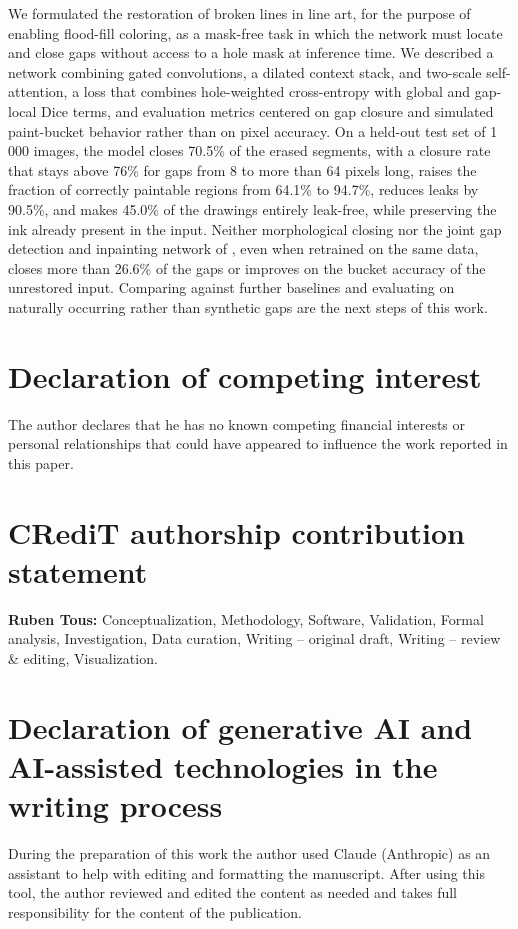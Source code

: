 \documentclass[preprint,12pt]{elsarticle}
\begin{document}
We formulated the restoration of broken lines in line art, for the purpose
of enabling flood-fill coloring, as a mask-free task in which the network must
locate and close gaps without access to a hole mask at inference time. We
described a network combining gated convolutions, a dilated context stack, and
two-scale self-attention, a loss that combines hole-weighted cross-entropy with
global and gap-local Dice terms, and evaluation metrics centered on gap closure and
simulated paint-bucket behavior rather than on pixel accuracy. On a held-out test set
of 1\,000 images, the model closes 70.5\% of the erased segments, with a closure rate
that stays above 76\% for gaps from 8 to more than 64 pixels long, raises the
fraction of correctly paintable regions from 64.1\% to 94.7\%, reduces leaks by
90.5\%, and makes 45.0\% of the drawings entirely leak-free, while preserving the ink
already present in the input. Neither morphological closing nor the joint gap
detection and inpainting network of \citet{sasaki2017joint}, even when retrained on
the same data, closes more than 26.6\% of the gaps or improves on the bucket accuracy
of the unrestored input. Comparing against further baselines and evaluating on naturally occurring rather than synthetic gaps
are the next steps of this work.

\section*{Declaration of competing interest}
The author declares that he has no known competing financial interests or personal
relationships that could have appeared to influence the work reported in this paper.

\section*{CRediT authorship contribution statement}
\textbf{Ruben Tous:} Conceptualization, Methodology, Software, Validation, Formal
analysis, Investigation, Data curation, Writing -- original draft, Writing -- review
\& editing, Visualization.

\section*{Declaration of generative AI and AI-assisted technologies in the writing process}
During the preparation of this work the author used Claude (Anthropic) as an
assistant to help with editing and formatting the manuscript. After using this tool,
the author reviewed and edited the content as needed and takes full responsibility
for the content of the publication.
\end{document}
